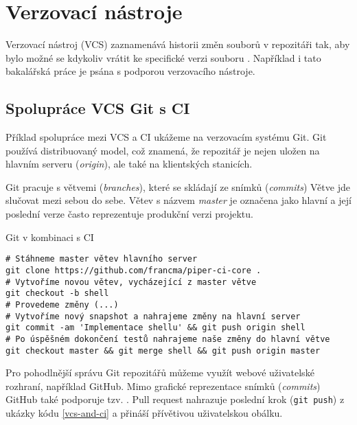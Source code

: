 \section{Verzovací nástroje}

Verzovací nástroj (VCS) zaznamenává historii změn souborů v repozitáři tak, aby bylo možné se kdykoliv vrátit ke specifické verzi souboru \cite{pro_git}.
Například i tato bakalářská práce je psána s podporou verzovacího nástroje.

\subsection{Spolupráce VCS Git s CI}

Příklad spolupráce mezi VCS a CI ukážeme na verzovacím systému Git.
Git používá distribuovaný model, což znamená, že repozitář je nejen uložen na hlavním serveru (\textit{origin}), ale také na klientských stanicích.

Git pracuje s větvemi (\textit{branches}), které se skládají ze snímků (\textit{commits})
Větve jde slučovat mezi sebou do sebe.
Větev s názvem \textit{master} je označena jako hlavní a její poslední verze často reprezentuje produkční verzi projektu.

\begin{listing}[ht]
\caption{\label{vcs-and-ci}Git v kombinaci s CI}
\begin{verbatim}
# Stáhneme master větev hlavního server 
git clone https://github.com/francma/piper-ci-core .
# Vytvoříme novou větev, vycházející z master větve
git checkout -b shell
# Provedeme změny (...)
# Vytvoříme nový snapshot a nahrajeme změny na hlavní server
git commit -am 'Implementace shellu' && git push origin shell
# Po úspěšném dokončení testů nahrajeme naše změny do hlavní větve
git checkout master && git merge shell && git push origin master
\end{verbatim}
\end{listing}

Pro pohodlnější správu Git repozitářů můžeme využít webové uživatelské rozhraní, například GitHub.
Mimo grafické reprezentace snímků (\textit{commits}) GitHub také podporuje tzv. . 
Pull request nahrazuje poslední krok (\verb|git push|) z ukázky kódu \ref{vcs-and-ci} a přináší přívětivou uživatelskou obálku.

